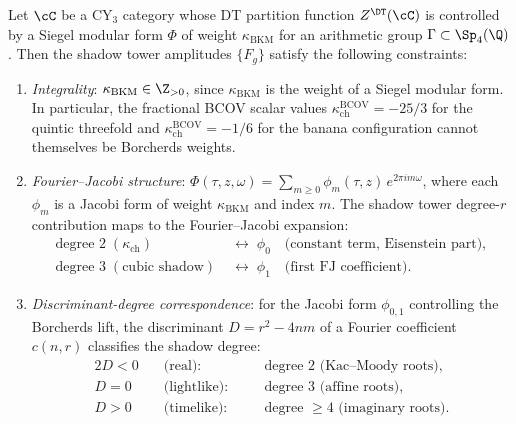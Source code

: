 \begin{theorem}
\label{thm:bkm-modularity-constraints}
Let $\cC$ be a CY$_3$ category whose DT partition function $Z^{\DT}(\cC)$ is controlled by a Siegel modular form $\Phi$ of weight $\kappa_{\mathrm{BKM}}$ for an arithmetic group $\Gamma \subset \Sp_4(\Q)$. Then the shadow tower amplitudes $\{F_g\}$ satisfy the following constraints:
\begin{enumerate}[label=(\roman*)]
 \item \emph{Integrality}: $\kappa_{\mathrm{BKM}} \in \Z_{>0}$, since $\kappa_{\mathrm{BKM}}$ is the weight of a Siegel modular form. In particular, the fractional BCOV scalar values $\kappa_{\mathrm{ch}}^{\mathrm{BCOV}} = -25/3$ for the quintic threefold and $\kappa_{\mathrm{ch}}^{\mathrm{BCOV}} = -1/6$ for the banana configuration cannot themselves be Borcherds weights.
 \item \emph{Fourier--Jacobi structure}: $\Phi(\tau, z, \omega) = \sum_{m \geq 0} \phi_m(\tau, z) \, e^{2\pi i m \omega}$, where each $\phi_m$ is a Jacobi form of weight $\kappa_{\mathrm{BKM}}$ and index $m$. The shadow tower degree-$r$ contribution maps to the Fourier--Jacobi expansion:
 \begin{align*}
 \text{degree } 2 \;(\kappa_{\mathrm{ch}}) &\;\longleftrightarrow\; \phi_0 \quad \text{(constant term, Eisenstein part)}, \\
 \text{degree } 3 \;(\text{cubic shadow}) &\;\longleftrightarrow\; \phi_1 \quad \text{(first FJ coefficient)}.
 \end{align*}
 \item \emph{Discriminant-degree correspondence}: for the Jacobi form $\phi_{0,1}$ controlling the Borcherds lift, the discriminant $D = r^2 - 4nm$ of a Fourier coefficient $c(n, r)$ classifies the shadow degree:
 \begin{alignat*}{2}
 D < 0 &\quad\text{(real)}: &\quad& \text{degree } 2 \text{ (Kac--Moody roots)}, \\
 D = 0 &\quad\text{(lightlike)}: &\quad& \text{degree } 3 \text{ (affine roots)}, \\
 D > 0 &\quad\text{(timelike)}: &\quad& \text{degree } \geq 4 \text{ (imaginary roots)}.
 \end{alignat*}
\end{enumerate}
\end{theorem}

